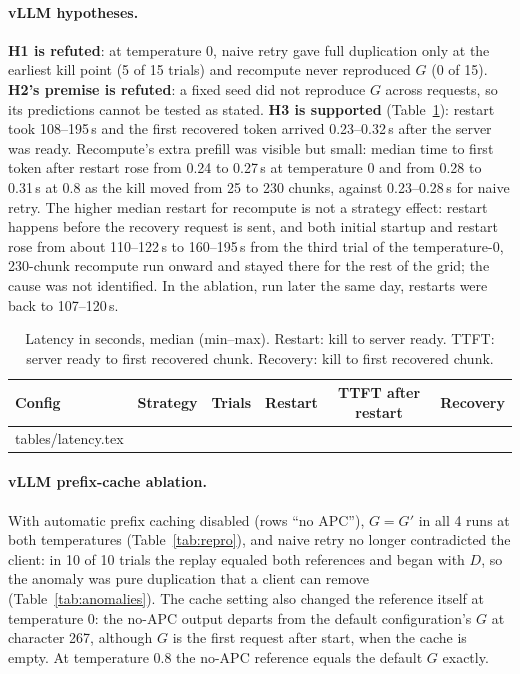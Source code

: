 \documentclass[10pt,twocolumn]{article}
\makeatletter
\def\LatRows{\@@input tables/latency.tex }
\makeatother
\begin{document}
\paragraph{vLLM hypotheses.} \textbf{H1 is refuted}: at temperature 0, naive
retry gave full duplication only at the earliest kill point (5 of 15 trials)
and recompute never reproduced $G$ (0 of 15). \textbf{H2's premise is
refuted}: a fixed seed did not reproduce $G$ across requests, so its
predictions cannot be tested as stated. \textbf{H3 is supported}
(Table~\ref{tab:latency}): restart took 108--195\,s and the first recovered
token arrived 0.23--0.32\,s after the server was ready. Recompute's extra
prefill was visible but small: median time to first token after restart rose
from 0.24 to 0.27\,s at temperature 0 and from 0.28 to 0.31\,s at 0.8 as the
kill moved from 25 to 230 chunks, against 0.23--0.28\,s for naive retry.
The higher median restart for recompute is not a strategy effect: restart
happens before the recovery request is sent, and both initial startup and
restart rose from about 110--122\,s to 160--195\,s from the third trial of
the temperature-0, 230-chunk recompute run onward and stayed there for the
rest of the grid; the cause was not identified. In the ablation, run later
the same day, restarts were back to 107--120\,s.

\begin{table}[t]
\centering\small
\caption{Latency in seconds, median (min--max). Restart: kill to server
ready. TTFT: server ready to first recovered chunk. Recovery: kill to first
recovered chunk.}
\label{tab:latency}
\begin{tabular}{@{}llrccc@{}}
\toprule
Config & Strategy & Trials & Restart & TTFT after restart & Recovery \\
\midrule
\LatRows
\bottomrule
\end{tabular}
\end{table}

\paragraph{vLLM prefix-cache ablation.} With automatic prefix caching disabled
(rows ``no APC''), $G=G'$ in all 4 runs at both temperatures
(Table~\ref{tab:repro}), and naive retry no longer contradicted the client:
in 10 of 10 trials the replay equaled both references and began with $D$, so
the anomaly was pure duplication that a client can remove
(Table~\ref{tab:anomalies}). The cache setting also changed the reference
itself at temperature 0: the no-APC output departs from the default
configuration's $G$ at character 267, although $G$ is the first request after
start, when the cache is empty. At temperature 0.8 the no-APC reference
equals the default $G$ exactly.
\end{document}
